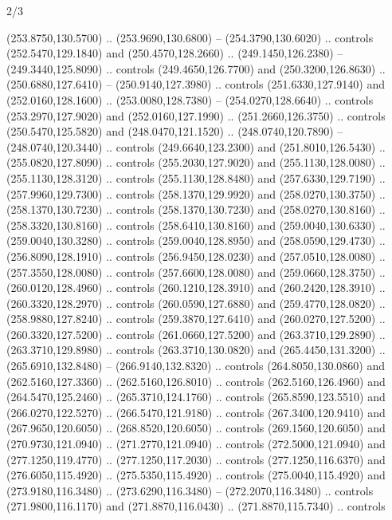 \begin{flagdescription}{2/3}
\begin{scope}[xshift=0.5\flaglength,yshift=0.5\flagwidth,scale=\flagwidth/259.2]
\begin{scope}[y=0.8pt, x=0.8pt, yscale=-1,shift={(-243,-162)}]
      (253.8750,130.5700) .. (253.9690,130.6800) -- (254.3790,130.6020) .. controls
      (252.5470,129.1840) and (250.4570,128.2660) .. (249.1450,126.2380) --
      (249.3440,125.8090) .. controls (249.4650,126.7700) and (250.3200,126.8630) ..
      (250.6880,127.6410) -- (250.9140,127.3980) .. controls (251.6330,127.9140) and
      (252.0160,128.1600) .. (253.0080,128.7380) -- (254.0270,128.6640) .. controls
      (253.2970,127.9020) and (252.0160,127.1990) .. (251.2660,126.3750) .. controls
      (250.5470,125.5820) and (248.0470,121.1520) .. (248.0740,120.7890) --
      (248.0740,120.3440) .. controls (249.6640,123.2300) and (251.8010,126.5430) ..
      (255.0820,127.8090) .. controls (255.2030,127.9020) and (255.1130,128.0080) ..
      (255.1130,128.3120) .. controls (255.1130,128.8480) and (257.6330,129.7190) ..
      (257.9960,129.7300) .. controls (258.1370,129.9920) and (258.0270,130.3750) ..
      (258.1370,130.7230) .. controls (258.1370,130.7230) and (258.0270,130.8160) ..
      (258.3320,130.8160) .. controls (258.6410,130.8160) and (259.0040,130.6330) ..
      (259.0040,130.3280) .. controls (259.0040,128.8950) and (258.0590,129.4730) ..
      (256.8090,128.1910) .. controls (256.9450,128.0230) and (257.0510,128.0080) ..
      (257.3550,128.0080) .. controls (257.6600,128.0080) and (259.0660,128.3750) ..
      (260.0120,128.4960) .. controls (260.1210,128.3910) and (260.2420,128.3910) ..
      (260.3320,128.2970) .. controls (260.0590,127.6880) and (259.4770,128.0820) ..
      (258.9880,127.8240) .. controls (259.3870,127.6410) and (260.0270,127.5200) ..
      (260.3320,127.5200) .. controls (261.0660,127.5200) and (263.3710,129.2890) ..
      (263.3710,129.8980) .. controls (263.3710,130.0820) and (265.4450,131.3200) ..
      (265.6910,132.8480) -- (266.9140,132.8320) .. controls (264.8050,130.0860) and
      (262.5160,127.3360) .. (262.5160,126.8010) .. controls (262.5160,126.4960) and
      (264.5470,125.2460) .. (265.3710,124.1760) .. controls (265.8590,123.5510) and
      (266.0270,122.5270) .. (266.5470,121.9180) .. controls (267.3400,120.9410) and
      (267.9650,120.6050) .. (268.8520,120.6050) .. controls (269.1560,120.6050) and
      (270.9730,121.0940) .. (271.2770,121.0940) .. controls (272.5000,121.0940) and
      (277.1250,119.4770) .. (277.1250,117.2030) .. controls (277.1250,116.6370) and
      (276.6050,115.4920) .. (275.5350,115.4920) .. controls (275.0040,115.4920) and
      (273.9180,116.3480) .. (273.6290,116.3480) -- (272.2070,116.3480) .. controls
      (271.9800,116.1170) and (271.8870,116.0430) .. (271.8870,115.7340) .. controls

\end{scope}
\end{scope}
\end{flagdescription}
